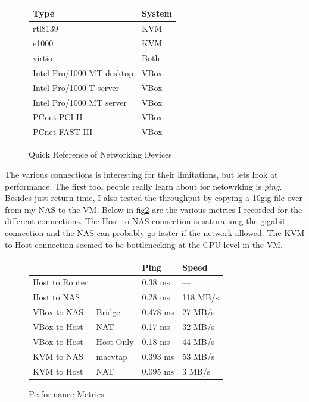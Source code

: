 \documentclass[12pt]{article}
\begin{document}
\begin{figure}[ht]
	\centering
	\begin{tabular}{|l|l|}
	\hline
	Type & System \\ \hline
	rtl8139 &KVM \\ \hline
	e1000 &KVM \\ \hline
	virtio &Both \\ \hline
	Intel Pro/1000 MT desktop &VBox \\ \hline
	Intel Pro/1000 T server &VBox \\ \hline
	Intel Pro/1000 MT server &VBox \\ \hline
	PCnet-PCI II &VBox \\ \hline
	PCnet-FAST III &VBox \\ \hline
	\end{tabular}
	\caption{Quick Reference of Networking Devices}
	\label{fig:network_device_table}
\end{figure}

The various connections is interesting for their limitations, but lets look at performance.
The first tool people really learn about for netowrking is \textit{ping}.
Besides just return time, I also tested the throughput by copying a 10gig file over from my NAS to the VM.
Below in fig\ref{fig:performance_network} are the various metrics I recorded for the different connections.
The Host to NAS connection is saturationg the gigabit connection and the NAS can probably go faster if the network allowed.
The KVM to Host connection seemed to be bottlenecking at the CPU level in the VM.

\begin{figure}[ht]
	\centering
	\begin{tabular}{|l|l|l|l|}
	\hline
	&& Ping & Speed \\ \hline
	Host to Router & & 0.38 ms & --- \\ \hline
	Host to NAS & & 0.28 ms & 118 MB/s \\ \hline
	VBox to NAS & Bridge & 0.478 ms & 27 MB/s \\ \hline
	VBox to Host & NAT & 0.17 ms & 32 MB/s \\ \hline
	VBox to Host & Host-Only & 0.18 ms & 44 MB/s\\ \hline
	KVM to NAS & macvtap & 0.393 ms & 53 MB/s \\ \hline
	KVM to Host & NAT & 0.095 ms & 3 MB/s \\ \hline
	\end{tabular}
	\caption{Performance Metrics}
	\label{fig:performance_network}
\end{figure}
\end{document}
